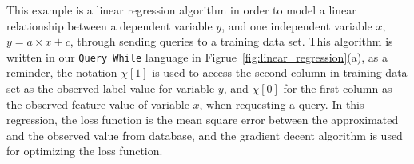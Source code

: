 \begin{example}
    This example is a linear regression algorithm 
    in order to
    model a linear relationship between a dependent variable $y$,
    and one independent variable $x$, $y = a \times x + c$,
    through sending queries to a training data set.
    This algorithm is written in our {\tt Query While} language in Figrue~\ref{fig:linear_regression}(a),
    as a reminder,
    the notation $\chi[1]$ is used to access the second column in training data set as the observed label value for variable $y$,
    and 
    $\chi[0]$ for the first column as the observed feature value of variable $x$, when requesting a query.
    In this regression, the loss function is the mean square error between the approximated and the observed value from database,
    and the gradient decent algorithm is used for optimizing the loss function.

\end{example}
